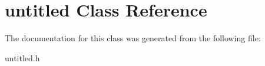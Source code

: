 \hypertarget{interfaceuntitled}{
\section{untitled Class Reference}
\label{interfaceuntitled}
}


The documentation for this class was generated from the following file:\begin{DoxyCompactItemize}
\item 
untitled.h\end{DoxyCompactItemize}
